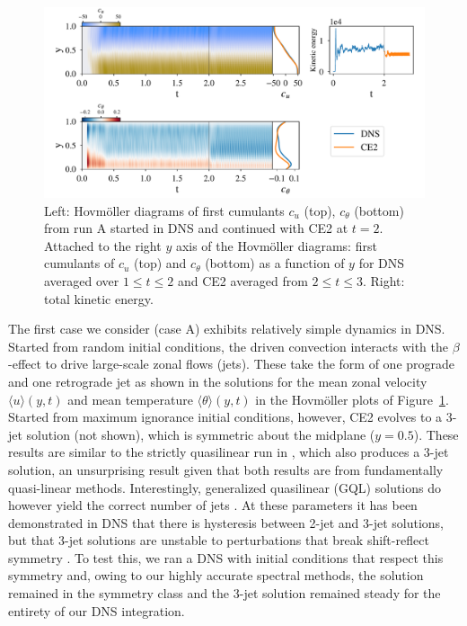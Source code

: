\documentclass{jfm}
\newcommand{\ct}{c_{\theta}}
\newcommand{\cu}{c_u}
\begin{document}
\begin{figure}
  \centering
  \includegraphics[width=\textwidth]{run_A_fig.pdf}
  \caption{Left: Hovm\"oller diagrams of first cumulants $\cu$ (top), $c_\theta$ (bottom) from run A started in DNS and continued with CE2 at $t=2$. Attached to the right $y$ axis of the Hovm\"oller diagrams: first cumulants of $\cu$ (top) and $\ct$ (bottom) as a function of $y$ for DNS averaged over $1 \le t \le 2$ and CE2 averaged from $2 \le t \le 3$. Right: total kinetic energy.}
  \label{fig:run_A}
\end{figure}

The first case we consider (case A) exhibits relatively simple dynamics in DNS. Started from random initial conditions, the driven convection interacts with the $\beta$-effect to drive large-scale zonal flows (jets). These take the form of one prograde and one retrograde jet as shown in the solutions for the mean zonal velocity $\langle u \rangle(y, t)$ and mean temperature $\langle \theta\rangle(y,t) $ in the Hovm\"oller plots of Figure~\ref{fig:run_A}. 
Started from maximum ignorance initial conditions, however, CE2 evolves to a 3-jet solution (not shown), which is symmetric about the midplane ($y=0.5$). These results are similar to the strictly quasilinear run in \citet{tom_2018}, which also produces a 3-jet solution, an unsurprising result given that both results are from fundamentally quasi-linear methods. Interestingly, generalized quasilinear (GQL) solutions do however yield the correct number of jets \citep{tom_2018}. At these parameters it has been demonstrated in DNS that there is hysteresis between 2-jet and 3-jet solutions, but that 3-jet solutions are unstable to perturbations that break shift-reflect symmetry \citep{bh1993}. To test this, we ran a DNS with initial conditions that respect this symmetry and, owing to our highly accurate spectral methods, the solution remained in the symmetry class and the 3-jet solution remained steady for the entirety of our DNS integration.
\end{document}
